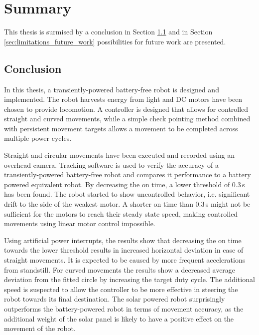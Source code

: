 \chapter{Summary}
\label{chp:summary}

This thesis is surmised by a conclusion in Section \ref{sec:conclusion} and in Section \ref{sec:limitations_future_work} possibilities for future work are presented.

\section{Conclusion}
\label{sec:conclusion}

In this thesis, a transiently-powered battery-free robot is designed and implemented.
The robot harvests energy from light and DC motors have been chosen to provide locomotion.
A controller is designed that allows for controlled straight and curved movements, while a simple check pointing method combined with persistent movement targets allows a movement to be completed across multiple power cycles.

Straight and circular movements have been executed and recorded using an overhead camera.
Tracking software is used to verify the accuracy of a transiently-powered battery-free robot and compares it performance to a battery powered equivalent robot.
By decreasing the on time, a lower threshold of 0.3\,s has been found.
The robot started to show uncontrolled behavior, i.e. significant drift to the side of the weakest motor.
A shorter on time than 0.3\,s might not be sufficient for the motors to reach their steady state speed, making controlled movements using linear motor control impossible.

Using artificial power interrupts, the results show that decreasing the on time towards the lower threshold results in increased horizontal deviation in case of straight movements.
It is expected to be caused by more frequent accelerations from standstill.
For curved movements the results show a decreased average deviation from the fitted circle by increasing the target duty cycle.
The additional speed is suspected to allow the controller to be more effective in steering the robot towards its final destination.
The solar powered robot surprisingly outperforms the battery-powered robot in terms of movement accuracy, as the additional weight of the solar panel is likely to have a positive effect on the movement of the robot.


